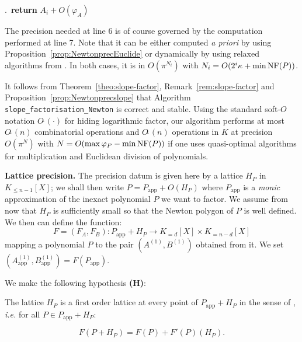 \documentclass{sig-alternate-05-2015}
\newcommand{\softO}{O\tilde{~}}
\newcommand{\NF}{\text{\rm NF}}
\newcommand{\app}{\textrm{app}}
\begin{document}
\smallskip{}.\ 
{\bf return} $A_i + O(\varphi_A)$

\vspace{-1ex}\noindent\hrulefill

\begin{rem}
The precision needed at line 6 is of course governed by the computation
performed at line 7. Note that it can be either computed \emph{a
priori} by using Proposition~\ref{prop:NewtonprecEuclide} or dynamically 
by using relaxed algorithms from 
\cites{hoeven:02a,hoeven:07a,berthomieu-hoeven-lecerf:11a}. In both 
cases, it is in $O(\pi^{N_i})$ with $N_i = O(2^i \kappa + \min 
\NF(P))$.
\end{rem}

\noindent
It follows from Theorem~\ref{theo:slope-factor}, 
Remark~\ref{rem:slope-factor} and Proposition~\ref{prop:Newtonprecslope} 
that Algorithm {\tt slope\_factorisation\_Newton} is correct and 
stable. Using the standard soft-$O$ notation $\softO(\cdot)$ for
hiding logarithmic factor, our algorithm performs at most $\softO(n)$ 
combinatorial operations and $\softO(n)$ operations in $K$ at precision 
$O(\pi^N)$ with $N = O(\max \varphi_P - \min \NF(P))$ if one uses 
quasi-optimal algorithms for multiplication and Euclidean division of 
polynomials.


\medskip

\noindent
{\bf Lattice precision.}
The precision datum is given here by a lattice $H_P$ in $K_{\leq n{-}1}
[X]$; we shall then write
$P = P_\app + O(H_P)$
where $P_\app$ is a \emph{monic} approximation of the inexact polynomial 
$P$ we want to factor. We assume from now that $H_P$ is sufficiently 
small so that the Newton polygon of $P$ is well defined. We then can
define the function:
$$F = (F_A, F_B) : P_\app + H_P \to K_{=d}[X] \times K_{=n{-}d}[X]$$
mapping a polynomial $P$ to the pair $(A^{(1)}, B^{(1)})$ obtained
from it. We set $(A_\app^{(1)}, B_\app^{(1)}) = F(P_\app)$.

We make the following hypothesis \textbf{(H)}:

\medskip

\noindent
\hfill
\begin{minipage}{8cm}
The lattice $H_P$ is a first order lattice at every point
of $P_\app + H_P$ in the sense of \cite[Definition~3.3]{caruso-roe-vaccon:14a},
\emph{i.e.} for all $P \in P_\app + H_P$:

\vspace{-5mm}

$$F(P + H_P) = F(P) + F'(P)(H_P).$$
\end{minipage}
\hfill \null
\end{document}
